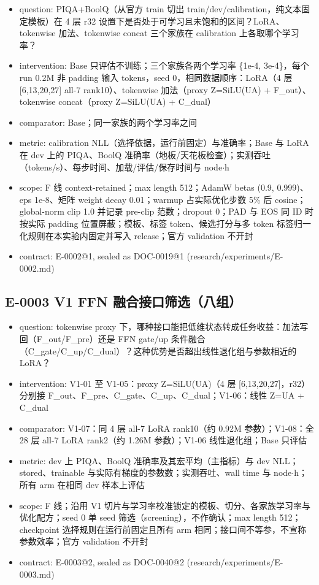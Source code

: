 \documentclass[11pt]{article}
\begin{document}
\begin{itemize}
\item question: PIQA+BoolQ（从官方 train 切出 train/dev/calibration，纯文本固定模板）在 4 层 r32 设置下是否处于可学习且未饱和的区间？LoRA、tokenwise 加法、tokenwise concat 三个家族在 calibration 上各取哪个学习率？
\item intervention: Base 只评估不训练；三个家族各两个学习率 \{1e-4, 3e-4\}，每个 run 0.2M 非 padding 输入 tokens，seed 0，相同数据顺序：LoRA（4 层 [6,13,20,27] all-7 rank10）、tokenwise 加法（proxy Z=SiLU(UA) + F\_out）、tokenwise concat（proxy Z=SiLU(UA) + C\_dual）
\item comparator: Base；同一家族的两个学习率之间
\item metric: calibration NLL（选择依据，运行前固定）与准确率；Base 与 LoRA 在 dev 上的 PIQA、BoolQ 准确率（地板/天花板检查）；实测吞吐（tokens/s）、每步时间、加载/评估/保存时间与 node\ensuremath{\cdot}h
\item scope: F 线 context-retained；max length 512；AdamW betas (0.9, 0.999)、eps 1e-8、矩阵 weight decay 0.01；warmup 占实际优化步数 5\% 后 cosine；global-norm clip 1.0 并记录 pre-clip 范数；dropout 0；PAD 与 EOS 同 ID 时按实际 padding 位置屏蔽；模板、标签 token、候选打分与多 token 标签归一化规则在本实验内固定并写入 release；官方 validation 不开封
\item contract: E-0002@1, sealed as DOC-0019@1 (research/experiments/E-0002.md)
\end{itemize}

\subsection*{E-0003 V1 FFN 融合接口筛选（八组）}

\begin{itemize}
\item question: tokenwise proxy 下，哪种接口能把低维状态转成任务收益：加法写回（F\_out/F\_pre）还是 FFN gate/up 条件融合（C\_gate/C\_up/C\_dual）？这种优势是否超出线性退化组与参数相近的 LoRA？
\item intervention: V1-01 至 V1-05：proxy Z=SiLU(UA)（4 层 [6,13,20,27]，r32）分别接 F\_out、F\_pre、C\_gate、C\_up、C\_dual；V1-06：线性 Z=UA + C\_dual
\item comparator: V1-07：同 4 层 all-7 LoRA rank10（约 0.92M 参数）；V1-08：全 28 层 all-7 LoRA rank2（约 1.26M 参数）；V1-06 线性退化组；Base 只评估
\item metric: dev 上 PIQA、BoolQ 准确率及其宏平均（主指标）与 dev NLL；stored、trainable 与实际有梯度的参数数；实测吞吐、wall time 与 node\ensuremath{\cdot}h；所有 arm 在相同 dev 样本上评估
\item scope: F 线；沿用 V1 切片与学习率校准锁定的模板、切分、各家族学习率与优化配方；seed 0 单 seed 筛选（screening），不作确认；max length 512；checkpoint 选择规则在运行前固定且所有 arm 相同；接口间不等参，不宣称参数效率；官方 validation 不开封
\item contract: E-0003@2, sealed as DOC-0040@2 (research/experiments/E-0003.md)
\end{itemize}
\end{document}
